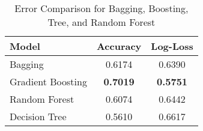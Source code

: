 \begin{table}[h]
\centering
\caption{Error Comparison for Bagging, Boosting, Tree, and Random Forest}
\label{tab:model_comparison}
\begin{tabular}{lcc}
\hline
\textbf{Model} & \textbf{Accuracy} & \textbf{Log-Loss} \\
\hline
Bagging & 0.6174 & 0.6390 \\
Gradient Boosting & \textbf{0.7019} & \textbf{0.5751} \\
Random Forest & 0.6074 & 0.6442 \\
Decision Tree & 0.5610 & 0.6617 \\
\hline
\end{tabular}
\end{table}
